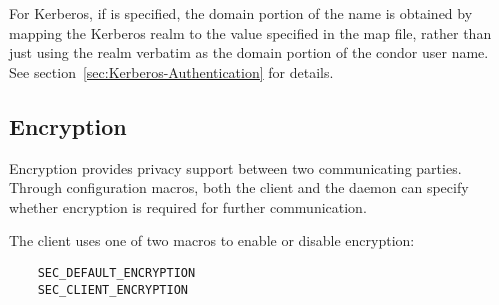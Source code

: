 For Kerberos, if  is specified, the domain portion
of the name is obtained by mapping the Kerberos realm to the value specified
in the map file, rather than just using the realm verbatim as the domain
portion of the condor user name.  See section~\ref{sec:Kerberos-Authentication}
for details.

\subsection{\label{sec:Security-Encryption}Encryption}
Encryption provides privacy support between two communicating parties.
Through configuration macros, both the client and the daemon
can specify whether encryption is required for further communication.

The client uses one of two macros to enable or disable encryption:
\begin{verbatim}
    SEC_DEFAULT_ENCRYPTION
    SEC_CLIENT_ENCRYPTION
\end{verbatim}

